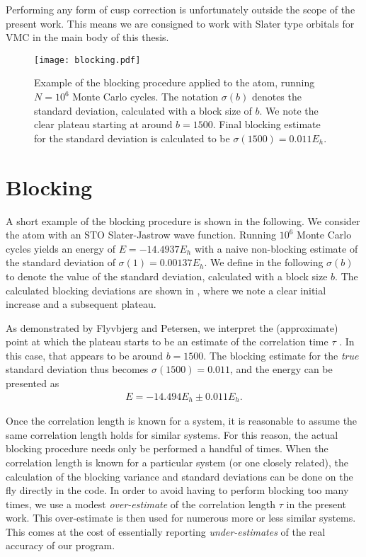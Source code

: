 \documentclass[../../master.tex]{subfiles}
\begin{document}
Performing any form of cusp correction is unfortunately outside the scope of the present work. This means we are consigned to work with Slater type orbitals for VMC in the main body of this thesis.





\begin{SCfigure}
\centering
\texttt{[image: blocking.pdf]}
\caption{Example of the blocking procedure applied to the  atom, running $N=10^6$ Monte Carlo cycles. The notation $\sigma(b)$ denotes the standard deviation, calculated with a block size of $b$. We note the clear plateau starting at around $b=1500$. Final blocking estimate for the standard deviation is calculated to be $\sigma(1500)=0.011 E_h$. \label{fig:blocking}}
\end{SCfigure}

\section{Blocking}
A short example of the blocking procedure is shown in the following. We consider the  atom with an STO Slater-Jastrow wave function. Running $10^6$ Monte Carlo cycles yields an energy of $E=-14.4937 E_h$ with a naive non-blocking estimate of the standard deviation of $\sigma(1)=0.00137 E_h$. We define in the following $\sigma(b)$ to denote the value of the standard deviation, calculated with a block size $b$. The calculated blocking deviations are shown in , where we note a clear initial increase and a subsequent plateau. 

As demonstrated by Flyvbjerg and Petersen, we interpret the (approximate) point at which the plateau starts to be an estimate of the correlation time $\tau$ \cite{blocking}. In this case, that appears to be around $b=1500$. The blocking estimate for the \emph{true} standard deviation thus becomes $\sigma(1500)=0.011$, and the energy can be presented as 
\begin{align}
E=-14.494E_h \pm 0.011 E_h.
\end{align} 

Once the correlation length is known for a system, it is reasonable to assume the same correlation length holds for similar systems. For this reason, the actual blocking procedure needs only be performed a handful of times. When the correlation length is known for a particular system (or one closely related), the calculation of the blocking variance and standard deviations can be done on the fly directly in the \CC{}{ }code. In order to avoid having to perform blocking too many times, we use a modest \emph{over-estimate} of the correlation length $\tau$ in the present work. This over-estimate is then used for numerous more or less similar systems. This comes at the cost of essentially reporting \emph{under-estimates} of the real accuracy of our program.
\end{document}
